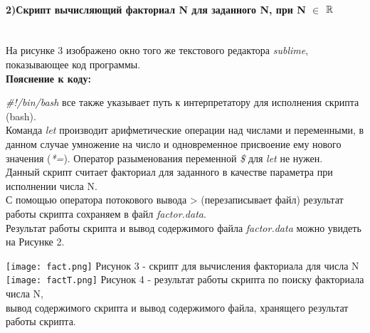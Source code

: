 	\vspace{1cm}
	\paragraph{2)Скрипт вычисляющий факториал N для заданного N, при N $\in$ $\mathbb{R}$\\ \\}
		На рисунке 3 изображено окно того же текстового редактора \textit{sublime}, показывающее код программы.\\

		\textbf{Пояснение к коду:\\}

		\textit{\#!/bin/bash} все также указывает путь к интерпретатору для исполнения скрипта (bash).\\
		
		Команда \textit{let} производит арифметические операции над числами и переменными, в данном случае умножение на число и одновременное присвоение ему нового значения (\textit{*=}). Оператор разыменования переменной \textit{\$} для \textit{let} не нужен.\\

		Данный скрипт считает факториал для заданного в качестве параметра при исполнении числа N.\\

		С помощью оператора потокового вывода > (перезаписывает файл) результат работы скрипта сохраняем в файл \textit{factor.data}.\\

		Результат работы скрипта и вывод содержимого файла \textit{factor.data} можно увидеть на Рисунке 2.\\

		\vspace{0.5cm}
		\begin{center}
			\texttt{[image: fact.png]}
			Рисунок 3 - скрипт для вычисления факториала для числа N\\

			\texttt{[image: factT.png]}
			Рисунок 4 - результат работы скрипта по поиску факториала числа N, \\ 
			вывод содержимого скрипта и вывод содержимого файла, хранящего результат работы скрипта.\\
		\end{center}